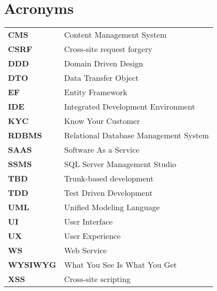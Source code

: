 \chapter{Acronyms}


\begin{tabular}{l l}


\textbf{CMS} & Content Management System \\
\textbf{CSRF} & Cross-site request forgery \\
\textbf{DDD} & Domain Driven Design \\



\textbf{DTO} & Data Transfer Object \\

\textbf{EF} & Entity Framework \\

\textbf{IDE} & Integrated Development Environment \\

\textbf{KYC} & Know Your Customer \\

\textbf{RDBMS} & Relational Database Management System \\

\textbf{SAAS} & Software As a Service \\

\textbf{SSMS} & SQL Server Management Studio \\

\textbf{TBD} & Trunk-based development \\
\textbf{TDD} & Test Driven Development \\


\textbf{UML} & Unified Modeling Language \\

\textbf{UI} & User Interface \\

\textbf{UX} & User Experience \\

\textbf{WS} & Web Service \\

\textbf{WYSIWYG} & What You See Is What You Get \\

\textbf{XSS} & Cross-site scripting \\



\end{tabular}

\pagebreak

